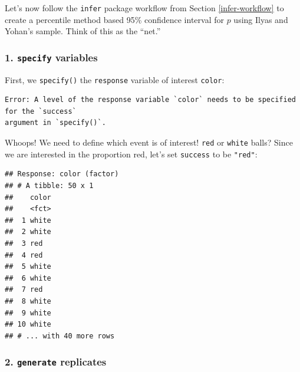 \documentclass[
]{book}
\newenvironment{Shaded}{\begin{snugshade}}{\end{snugshade}}
\newcommand{\DataTypeTok}[1]{\textcolor[rgb]{0.13,0.29,0.53}{#1}}
\newcommand{\DecValTok}[1]{\textcolor[rgb]{0.00,0.00,0.81}{#1}}
\newcommand{\KeywordTok}[1]{\textcolor[rgb]{0.13,0.29,0.53}{\textbf{#1}}}
\newcommand{\NormalTok}[1]{#1}
\newcommand{\OperatorTok}[1]{\textcolor[rgb]{0.81,0.36,0.00}{\textbf{#1}}}
\newcommand{\StringTok}[1]{\textcolor[rgb]{0.31,0.60,0.02}{#1}}
\begin{document}
Let's now follow the \texttt{infer} package workflow from Section \ref{infer-workflow} to create a percentile method based 95\% confidence interval for \(p\) using Ilyas and Yohan's sample. Think of this as the ``net.''

\hypertarget{specify-variables-1}{%
\subsubsection*{\texorpdfstring{1. \texttt{specify} variables}{1. specify variables}}\label{specify-variables-1}}

First, we \texttt{specify()} the \texttt{response} variable of interest \texttt{color}:

\begin{Shaded}
\end{Shaded}

\begin{verbatim}
Error: A level of the response variable `color` needs to be specified for the `success`
argument in `specify()`.
\end{verbatim}

Whoops! We need to define which event is of interest! \texttt{red} or \texttt{white} balls? Since we are interested in the proportion red, let's set \texttt{success} to be \texttt{"red"}:

\begin{Shaded}
\end{Shaded}

\begin{verbatim}
## Response: color (factor)
## # A tibble: 50 x 1
##    color
##    <fct>
##  1 white
##  2 white
##  3 red  
##  4 red  
##  5 white
##  6 white
##  7 red  
##  8 white
##  9 white
## 10 white
## # ... with 40 more rows
\end{verbatim}

\hypertarget{generate-replicates-1}{%
\subsubsection*{\texorpdfstring{2. \texttt{generate} replicates}{2. generate replicates}}\label{generate-replicates-1}}
\end{document}
